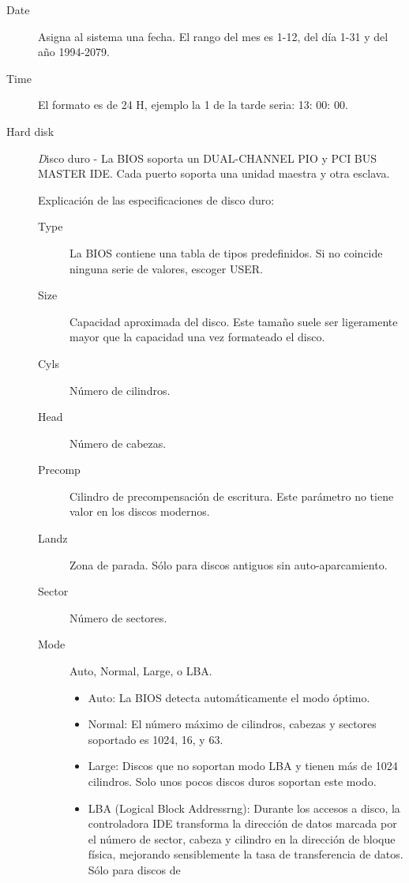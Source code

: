 \documentclass[12pt,oneside,a4paper]{article}
\begin{document}
			\begin{description}
				\item[Date] Asigna al sistema una fecha. El rango del mes es 1-12, del día 1-31 y del año 1994-2079.
				\item[Time] El formato es de 24 H, ejemplo la 1 de la tarde seria: 13: 00: 00.
				\item[Hard disk] {\emph Disco duro} - La BIOS soporta un
					DUAL-CHANNEL PIO y PCI BUS MASTER IDE. Cada puerto soporta
					una unidad maestra y otra esclava.

					{\large Explicación de las especificaciones de disco duro:}
                
					\begin{description}
						\item[Type] La BIOS contiene una tabla de tipos
							predefinidos. Si no coincide ninguna serie de
							valores, escoger USER.
						\item[Size] Capacidad aproximada del disco. Este tamaño
							suele ser ligeramente mayor que la capacidad una
							vez formateado el disco.
						\item[Cyls] Número de cilindros.
						\item[Head] Número de cabezas.
						\item[Precomp] Cilindro de precompensación de
							escritura. Este parámetro no tiene valor en los
							discos modernos.
					    \item[Landz] Zona de parada. Sólo para discos antiguos sin auto-aparcamiento.
					    \item[Sector] Número de sectores.
						\item[Mode] Auto, Normal, Large, o LBA.
						\begin{itemize}
							\item Auto: La BIOS detecta automáticamente el modo
								óptimo.  \item Normal: El número máximo de
								cilindros, cabezas y sectores soportado es
								1024, 16, y 63.
							\item Large: Discos que no soportan modo LBA y
								tienen más de 1024 cilindros. Solo unos pocos
								discos duros soportan este modo.
							\item LBA (Logical Block Addressrng): Durante los
								accesos a disco, la controladora IDE transforma
								la dirección de datos marcada por el número de
								sector, cabeza y cilindro en la dirección de
								bloque física, mejorando sensiblemente la tasa
								de transferencia de datos. Sólo para discos de

\end{itemize}
\end{description}
\end{description}
\end{document}
